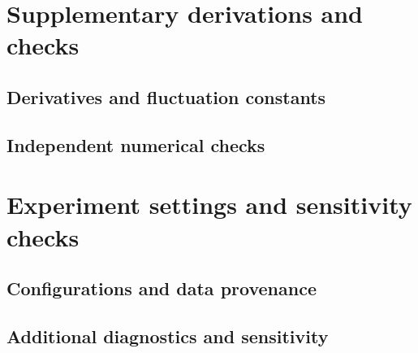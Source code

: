\section{Supplementary derivations and checks}
\label{app:derivations-and-checks}

\subsection{Derivatives and fluctuation constants}
\label{app:support-calculations}

\subsection{Independent numerical checks}
\label{app:numerical-checks}

\section{Experiment settings and sensitivity checks}
\label{app:experiment-details}

\subsection{Configurations and data provenance}
\label{app:configurations}

\subsection{Additional diagnostics and sensitivity}
\label{app:sensitivity}

\par\allowbreak
